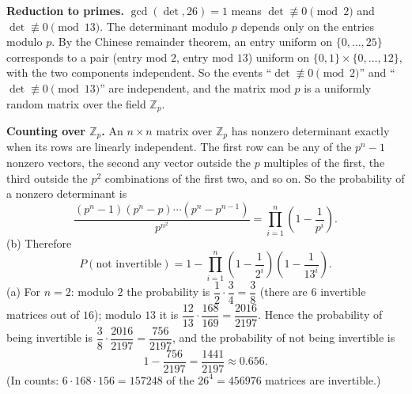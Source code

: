 \textbf{Reduction to primes.} $\gcd(\det,26)=1$ means $\det\not\equiv0\pmod2$ and $\det\not\equiv0\pmod{13}$. The determinant modulo $p$ depends only on the entries modulo $p$. By the Chinese remainder theorem, an entry uniform on $\{0,\dots,25\}$ corresponds to a pair (entry mod $2$, entry mod $13$) uniform on $\{0,1\}\times\{0,\dots,12\}$, with the two components independent. So the events ``$\det\not\equiv0\pmod2$'' and ``$\det\not\equiv0\pmod{13}$'' are independent, and the matrix mod $p$ is a uniformly random matrix over the field $\mathbb Z_p$.

\textbf{Counting over $\mathbb Z_p$.} An $n\times n$ matrix over $\mathbb Z_p$ has nonzero determinant exactly when its rows are linearly independent. The first row can be any of the $p^n-1$ nonzero vectors, the second any vector outside the $p$ multiples of the first, the third outside the $p^2$ combinations of the first two, and so on. So the probability of a nonzero determinant is
\[
\dfrac{(p^n-1)(p^n-p)\cdots(p^n-p^{n-1})}{p^{n^2}}=\prod_{i=1}^{n}\left(1-\dfrac{1}{p^i}\right).
\]
(b) Therefore
\[
P(\text{not invertible})=\boxed{1-\prod_{i=1}^{n}\left(1-\dfrac{1}{2^i}\right)\left(1-\dfrac{1}{13^i}\right)}.
\]
(a) For $n=2$: modulo $2$ the probability is $\dfrac{1}{2}\cdot\dfrac{3}{4}=\dfrac{3}{8}$ (there are $6$ invertible matrices out of $16$); modulo $13$ it is $\dfrac{12}{13}\cdot\dfrac{168}{169}=\dfrac{2016}{2197}$. Hence the probability of being invertible is $\dfrac{3}{8}\cdot\dfrac{2016}{2197}=\dfrac{756}{2197}$, and the probability of not being invertible is
\[
1-\dfrac{756}{2197}=\boxed{\dfrac{1441}{2197}}\approx0.656 .
\]
(In counts: $6\cdot168\cdot156=157248$ of the $26^4=456976$ matrices are invertible.)
